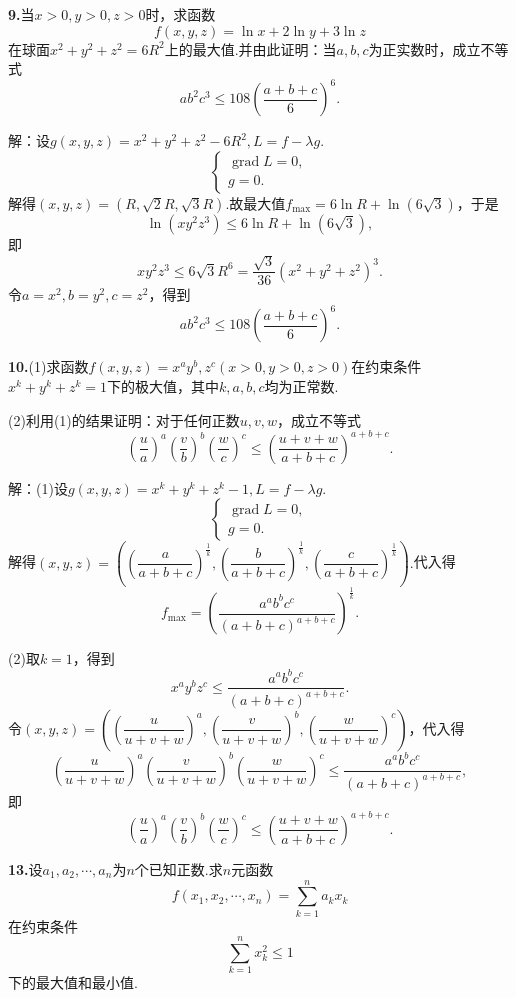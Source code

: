 \documentclass[12pt, a4paper]{article}
\begin{document}
\textbf{9.}当\(x > 0, y > 0, z > 0\)时，求函数
\[f(x, y, z) = \ln x + 2\ln y + 3\ln z\]
在球面\(x^2 + y^2 + z^2 = 6R^2\)上的最大值.并由此证明：当\(a, b, c\)为正实数时，成立不等式
\[ab^2c^3 \leq 108\left(\frac{a + b + c}{6}\right)^6.\]

解：设\(g(x, y, z) = x^2 + y^2 + z^2 - 6R^2, L = f - \lambda g.\)
\[\begin{cases}
\operatorname{grad} L = 0,\\
g = 0.
\end{cases}\]
解得\((x, y, z) = (R, \sqrt{2}R, \sqrt{3}R).\)故最大值\(f_{\text{max}} = 6\ln R + \ln(6\sqrt{3})\)，于是
\[\ln(xy^2z^3) \leq 6\ln R + \ln(6\sqrt{3}),\]
即
\[xy^2z^3 \leq 6\sqrt{3}R^6 = \frac{\sqrt{3}}{36}(x^2 + y^2 + z^2)^3.\]
令\(a = x^2, b = y^2, c = z^2\)，得到
\[ab^2c^3 \leq 108\left(\frac{a + b + c}{6}\right)^6.\]

\textbf{10.}(1)求函数\(f(x, y, z) = x^a y^b, z^c (x > 0, y > 0, z > 0)\)在约束条件\(x^k + y^k + z^k = 1\)下的极大值，其中\(k, a, b, c\)均为正常数.

(2)利用(1)的结果证明：对于任何正数\(u, v, w\)，成立不等式
\[\left(\frac{u}{a}\right)^a \left(\frac{v}{b}\right)^b \left(\frac{w}{c}\right)^c \leq \left(\frac{u + v + w}{a + b + c}\right)^{a + b + c}.\]

解：(1)设\(g(x, y, z) = x^k + y^k + z^k - 1, L = f - \lambda g.\)
\[\begin{cases}
\operatorname{grad} L = 0,\\
g = 0.
\end{cases}\]
解得\((x, y, z) = \left(\left(\dfrac{a}{a + b + c}\right)^\frac{1}{k}, \left(\dfrac{b}{a + b + c}\right)^\frac{1}{k}, \left(\dfrac{c}{a + b + c}\right)^\frac{1}{k}\right).\)代入得
\[f_{\text{max}} = \left(\frac{a^a b^b c^c}{(a + b + c)^{a + b + c}}\right)^\frac{1}{k}.\]

(2)取\(k = 1\)，得到
\[x^a y^b z^c \leq \frac{a^a b^b c^c}{(a + b + c)^{a + b + c}}.\]
令\((x, y, z) = \left(\left(\dfrac{u}{u + v + w}\right)^a, \left(\dfrac{v}{u + v + w}\right)^b, \left(\dfrac{w}{u + v + w}\right)^c\right)\)，代入得
\[\left(\dfrac{u}{u + v + w}\right)^a \left(\dfrac{v}{u + v + w}\right)^b \left(\dfrac{w}{u + v + w}\right)^c \leq \frac{a^a b^b c^c}{(a + b + c)^{a + b + c}},\]
即
\[\left(\frac{u}{a}\right)^a \left(\frac{v}{b}\right)^b \left(\frac{w}{c}\right)^c \leq \left(\frac{u + v + w}{a + b + c}\right)^{a + b + c}.\]

\textbf{13.}设\(a_1, a_2, \cdots, a_n\)为\(n\)个已知正数.求\(n\)元函数
\[f(x_1, x_2, \cdots, x_n) = \sum_{k = 1}^{n} a_k x_k\]
在约束条件
\[\sum_{k = 1}^{n} x_k^2 \leq 1\]
下的最大值和最小值.
\end{document}
